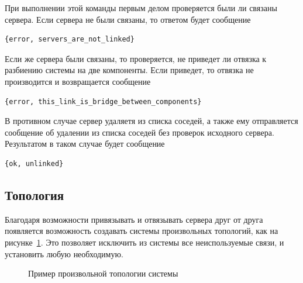 			При выполнении этой команды первым делом проверяется были ли связаны сервера. Если сервера не были связаны, то ответом будет сообщение
			\begin{lstlisting}
{error, servers_are_not_linked}
			\end{lstlisting}
			Если же сервера были связаны, то проверяется, не приведет ли отвязка к разбиению системы на две компоненты. Если приведет, то отвязка не 
			производится и возвращается сообщение
			\begin{lstlisting}
{error, this_link_is_bridge_between_components}
			\end{lstlisting}
			В противном случае сервер удаляетя из списка соседей, а также ему отправляется сообщение об удалении из списка соседей без проверок
			исходного сервера. Результатом в таком случае будет сообщение
			\begin{lstlisting}
{ok, unlinked}
			\end{lstlisting}
			
		\subsection{Топология}
			Благодаря возможности привязывать и отвязывать сервера друг от друга появляется возможность создавать системы произвольных топологий, как на рисунке~\ref{fig:ex}. Это позволяет
			исключить из системы все неиспользуемые связи, и установить любую необходимую.
			\begin{figure}[H] 
				\centering 
				\caption{Пример произвольной топологии системы} 
				\label{fig:ex}
			\end{figure}


